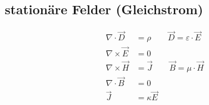 \subsection{stationäre Felder (Gleichstrom)}

\begin{align*}
    \nabla \cdot \vec{D}  & = \rho \qquad \vec{D} = \varepsilon \cdot \vec{E} \\
    \nabla \times \vec{E} & = 0                                               \\
    \nabla \times \vec{H} & = \vec{J} \qquad \vec{B} = \mu \cdot \vec{H}      \\
    \nabla \cdot \vec{B}  & = 0                                               \\
    \vec{J}               & = \kappa \vec{E}
\end{align*}

